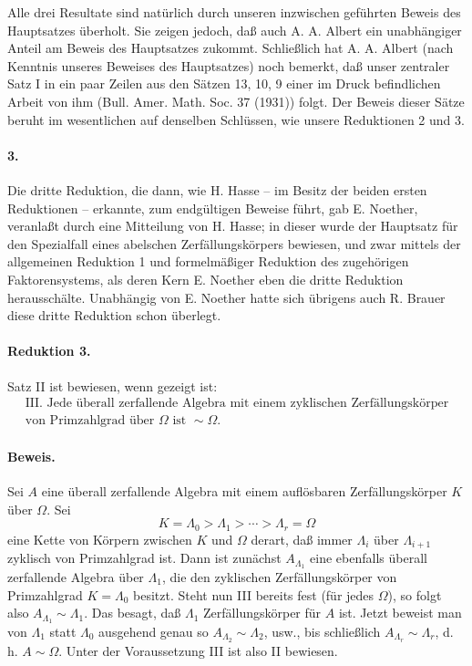 {Alle drei Resultate sind natürlich durch unseren inzwischen geführten Beweis des Hauptsatzes überholt. Sie zeigen jedoch, daß auch A. A. Albert ein unabhängiger Anteil am Beweis des Hauptsatzes zukommt. Schließlich hat A. A. Albert (nach Kenntnis unseres Beweises des Hauptsatzes) noch bemerkt, daß unser zentraler Satz I in ein paar Zeilen aus den Sätzen 13, 10, 9 einer im Druck befindlichen Arbeit von ihm (Bull. Amer. Math. Soc. 37 (1931)) folgt. Der Beweis dieser Sätze beruht im wesentlichen auf denselben Schlüssen, wie unsere Reduktionen 2 und 3.}

\paragraph{3.}
Die dritte Reduktion, die dann, wie H. Hasse -- im Besitz der beiden ersten Reduktionen -- erkannte, zum endgültigen Beweise führt, gab E. Noether, veranlaßt durch eine Mitteilung von H. Hasse; in dieser wurde der Hauptsatz für den Spezialfall eines abelschen Zerfällungskörpers bewiesen, und zwar mittels der allgemeinen Reduktion 1 und formelmäßiger Reduktion des zugehörigen Faktorensystems, als deren Kern E. Noether eben die dritte Reduktion herausschälte. Unabhängig von E. Noether hatte sich übrigens auch R. Brauer diese dritte Reduktion schon überlegt.

\paragraph{Reduktion 3.}
Satz II ist bewiesen, wenn gezeigt ist:
\[
\begin{gathered}\text{III. Jede überall zerfallende Algebra mit einem zyklischen Zerfällungskörper}\\\text{von Primzahlgrad über }\Omega\text{ ist }\sim\Omega .\end{gathered}
\]

\paragraph{Beweis.}
Sei \(A\) eine überall zerfallende Algebra mit einem auflösbaren Zerfällungskörper \(K\) über \(\Omega\). Sei
\[
K=\Lambda_0>\Lambda_1>\cdots>\Lambda_r=\Omega
\]
eine Kette von Körpern zwischen \(K\) und \(\Omega\) derart, daß immer \(\Lambda_i\) über \(\Lambda_{i+1}\) zyklisch von Primzahlgrad ist. Dann ist zunächst \(A_{\Lambda_1}\) eine ebenfalls überall zerfallende Algebra über \(\Lambda_1\), die den zyklischen Zerfällungskörper von Primzahlgrad \(K=\Lambda_0\) besitzt. Steht nun III bereits fest (für jedes \(\Omega\)), so folgt also \(A_{\Lambda_1}\sim \Lambda_1\). Das besagt, daß \(\Lambda_1\) Zerfällungskörper für \(A\) ist. Jetzt beweist man von \(\Lambda_1\) statt \(\Lambda_0\) ausgehend genau so \(A_{\Lambda_2}\sim\Lambda_2\), usw., bis schließlich \(A_{\Lambda_r}\sim\Lambda_r\), d. h. \(A\sim\Omega\). Unter der Voraussetzung III ist also II bewiesen.

